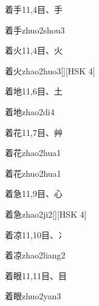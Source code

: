 \begin{Entry}{着手}{11,4}{⽬、⼿}
  \begin{Phonetics}{着手}{zhuo2shou3}
  \end{Phonetics}
\end{Entry}

\begin{Entry}{着火}{11,4}{⽬、⽕}
  \begin{Phonetics}{着火}{zhao2huo3}[][HSK 4]
  \end{Phonetics}
\end{Entry}

\begin{Entry}{着地}{11,6}{⽬、⼟}
  \begin{Phonetics}{着地}{zhao2di4}
  \end{Phonetics}
\end{Entry}

\begin{Entry}{着花}{11,7}{⽬、⾋}
  \begin{Phonetics}{着花}{zhao2hua1}
  \end{Phonetics}
  \begin{Phonetics}{着花}{zhuo2hua1}
  \end{Phonetics}
\end{Entry}

\begin{Entry}{着急}{11,9}{⽬、⼼}
  \begin{Phonetics}{着急}{zhao2ji2}[][HSK 4]
  \end{Phonetics}
\end{Entry}

\begin{Entry}{着凉}{11,10}{⽬、⼎}
  \begin{Phonetics}{着凉}{zhao2liang2}
  \end{Phonetics}
\end{Entry}

\begin{Entry}{着眼}{11,11}{⽬、⽬}
  \begin{Phonetics}{着眼}{zhuo2yan3}
  \end{Phonetics}
\end{Entry}

